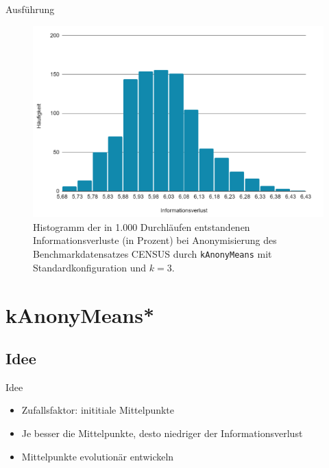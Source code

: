 \documentclass[10pt,table]{beamer}
\newcommand{\kanonymeans}{\texttt{kAnonyMeans}\xspace}
\begin{document}
\begin{frame}{Ausführung}
    \begin{figure}[H]
        \centering
        \includegraphics[scale=0.4]{Images/infloss-histogram-1000runs.png}
        \caption{Histogramm der in 1.000 Durchläufen entstandenen Informationsverluste (in Prozent) bei Anonymisierung des Benchmarkdatensatzes CENSUS durch \kanonymeans mit Standardkonfiguration und $k=3$.}
        \label{fig:histogram-census}
    \end{figure}
\end{frame}

\section{kAnonyMeans*}
\subsection{Idee}
\begin{frame}{Idee}
\begin{itemize}
    \item Zufallsfaktor: inititiale Mittelpunkte
    \item \glqq Je besser die Mittelpunkte, desto niedriger der Informationsverlust\grqq
    \item Mittelpunkte evolutionär entwickeln 
\end{itemize}
    
\end{frame}
\end{document}
